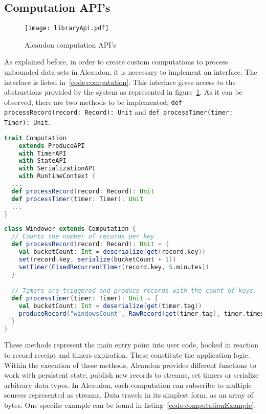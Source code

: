 \subsection{Computation API's}

\begin{figure}[!h]
  \begin{center}
  \texttt{[image: libraryApi.pdf]}
  \caption{Alcaudon computation API's}
  \label{fig:apis}
  \end{center}
\end{figure}

As explained before, in order to create custom computations to process unbounded
data-sets in Alcaudon, it is necessary to implement an interface. The interface
is listed in~\ref{code:computation}. This interface gives access to the
abstractions provided by the system as represented in figure~\ref{fig:apis}. As
it can be observed, there are two methods to be implemented;
\lstinline[columns=fixed]{def processRecord(record: Record): Unit} and \lstinline[columns=fixed]{def processTimer(timer: Timer): Unit}.

\begin{lstlisting}[language=scala, frame=trBL, label=code:computation, float=ht, caption = {Computation API's}]
trait Computation
    extends ProduceAPI
    with TimerAPI
    with StateAPI
    with SerializationAPI
    with RuntimeContext {
  ...
  def processRecord(record: Record): Unit
  def processTimer(timer: Timer): Unit
  ...
}
\end{lstlisting}

\begin{lstlisting}[language=scala, frame=trBL, label=code:computationExample, float=ht, caption = {Computation example}]
class Windower extends Computation {
  // Counts the number of records per key
  def processRecord(record: Record): Unit = {
    val bucketCount: Int = deserialize(get(record.key))
    set(record.key, serialize(bucketCount + 1))
    setTimer(FixedRecurrentTimer(record.key, 5.minutes))
  }

  // Timers are triggered and produce records with the count of keys.
  def processTimer(timer: Timer): Unit = {
    val bucketCount: Int = deserialize(get(timer.tag))
    produceRecord("windowsCount", RawRecord(get(timer.tag), timer.timestamp))
  }
}
\end{lstlisting}

These methods represent the main entry point into user code, hooked in reaction to
record receipt and timers expiration. These constitute the application logic.
Within the execution of these methods, Alcaudon provides different functions to
work with persistent state, publish new records to streams, set timers or
serialize arbitrary data types. In Alcaudon, each computation can subscribe to
multiple sources represented as streams. Data travels in its simplest form,
as an array of bytes. One specific example can be found in listing~\ref{code:computationExample}.

